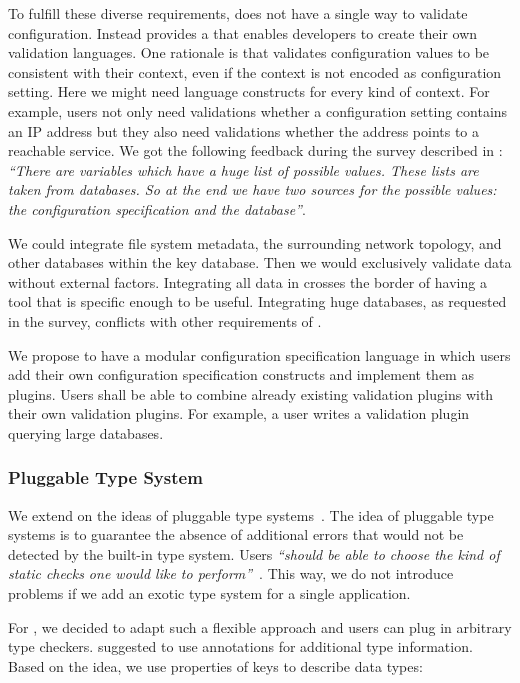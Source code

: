 To fulfill these diverse requirements, \elektra{} does not have a single way to validate configuration.
Instead \elektra{} provides a  that enables developers to create their own validation languages.
One rationale is that \elektra{} validates configuration values to be consistent with their context, even if the context is not encoded as configuration setting.
Here we might need language constructs for every kind of context.
For example, users not only need validations whether a configuration setting contains an IP address but they also need validations whether the address points to a reachable service.
We got the following feedback during the survey described in :
\emph{``There are variables which have a huge list of possible values. These lists are taken from databases. So at the end we have two sources for the possible values: the configuration specification and the database''}.

We could integrate file system metadata, the surrounding network topology, and other databases within the key database.
Then we would exclusively validate data without external factors.
Integrating all data in \elektra{} crosses the border of having a tool that is specific enough to be useful.
Integrating huge databases, as requested in the survey, conflicts with other requirements of \elektra{}.

We propose to have a modular configuration specification language in which users add their own configuration specification constructs and implement them as plugins.
Users shall be able to combine already existing validation plugins with their own validation plugins.
For example, a user writes a validation plugin querying large databases.

\subsubsection{Pluggable Type System}

We extend on the ideas of pluggable type systems~\cite{andreae2006framework,haldiman2009practical,papi2008practical}.
The idea of pluggable type systems is to guarantee the absence of additional errors that would not be detected by the built-in type system.
Users \emph{``should be able to choose the kind of static checks one would like to perform''}~\cite{haldiman2009practical}.
This way, we do not introduce problems if we add an exotic type system for a single application.

For , we decided to adapt such a flexible approach and users can plug in arbitrary type checkers.
\citet{papi2008practical} suggested to use annotations for additional type information.
Based on the idea, we use properties of keys to describe data types:

